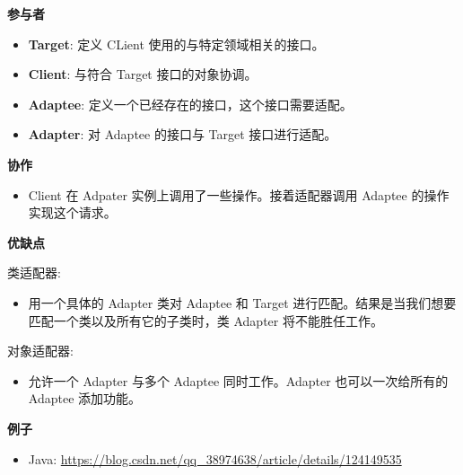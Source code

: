 \begin{figure}[H]
    \scriptsize
    \centering
\end{figure}

\noindent\textbf{参与者}

\begin{itemize}
    \item \textbf{Target}: 定义 CLient 使用的与特定领域相关的接口。
    \item \textbf{Client}: 与符合 Target 接口的对象协调。
    \item \textbf{Adaptee}: 定义一个已经存在的接口，这个接口需要适配。
    \item \textbf{Adapter}: 对 Adaptee 的接口与 Target 接口进行适配。
\end{itemize}

\noindent\textbf{协作}
\begin{itemize}
    \item Client 在 Adpater 实例上调用了一些操作。接着适配器调用 Adaptee 的操作实现这个请求。
\end{itemize}

\noindent\textbf{优缺点}

类适配器:
\begin{itemize}
    \item 用一个具体的 Adapter 类对 Adaptee 和 Target 进行匹配。结果是当我们想要匹配一个类以及所有它的子类时，类 Adapter 将不能胜任工作。
\end{itemize}

对象适配器:
\begin{itemize}
    \item 允许一个 Adapter 与多个 Adaptee 同时工作。Adapter 也可以一次给所有的 Adaptee 添加功能。
\end{itemize}

\textbf{例子}

\begin{itemize}
    \item Java: \url{https://blog.csdn.net/qq_38974638/article/details/124149535}
\end{itemize}



\newpage